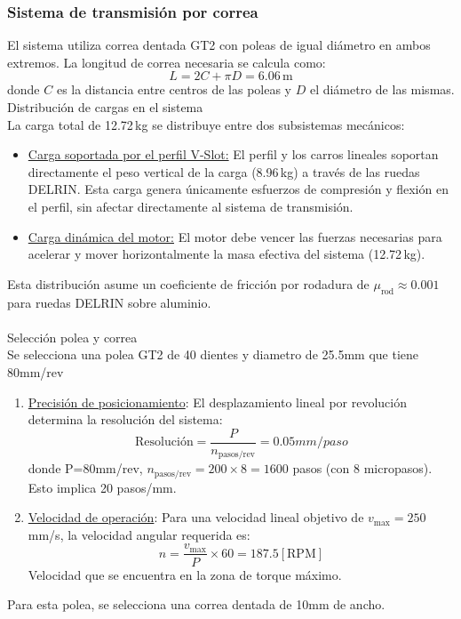 \subsubsection{Sistema de transmisión por correa}
El sistema utiliza correa dentada GT2 con poleas de igual diámetro en ambos extremos. La longitud de correa necesaria se calcula como:
\begin{equation}
L = 2C + \pi D = 6.06\,\text{m}
\label{eq:longitud_correa}
\end{equation}
donde $C$ es la distancia entre centros de las poleas y $D$ el diámetro de las mismas. \\

Distribución de cargas en el sistema\\
\noindent
La carga total de 12.72\,kg se distribuye entre dos subsistemas mecánicos:

\begin{itemize}[label=$\bullet$]
    \item \underline{Carga soportada por el perfil V-Slot:} El perfil y los carros lineales soportan directamente el peso vertical de la carga (8.96\,kg) a través de las ruedas DELRIN. Esta carga genera únicamente esfuerzos de compresión y flexión en el perfil, sin afectar directamente al sistema de transmisión.
    
    \item \underline{Carga dinámica del motor:} El motor debe vencer las fuerzas necesarias para acelerar y mover horizontalmente la masa efectiva del sistema (12.72\,kg).
\end{itemize}

Esta distribución asume un coeficiente de fricción por rodadura de $\mu_{\text{rod}} \approx 0.001$ para ruedas DELRIN sobre aluminio.\\ \\
Selección polea y correa\\
\noindent
Se selecciona una polea GT2 de 40 dientes y diametro de 25.5mm que tiene 80mm/rev

\begin{enumerate}
    \item \underline{Precisión de posicionamiento}: El desplazamiento lineal por revolución determina la resolución del sistema:
    \begin{equation}
    \text{Resolución} = \frac{P}{n_{\text{pasos/rev}}} = 0.05mm/paso
    \end{equation}
    donde P=80mm/rev, $n_{\text{pasos/rev}} = 200 \times 8 = 1600$ pasos (con 8 micropasos). Esto implica 20 pasos/mm.
    \item \underline{Velocidad de operación}: Para una velocidad lineal objetivo de $v_{\text{max}} = 250$\,mm/s, la velocidad angular requerida es:
    \begin{equation}
    n = \frac{v_{\text{max}}}{P} \times 60 = 187.5 [\text{RPM}] 
    \end{equation}
    Velocidad que se encuentra en la zona de torque máximo.
\end{enumerate}
Para esta polea, se selecciona una correa dentada de 10mm de ancho.\\

